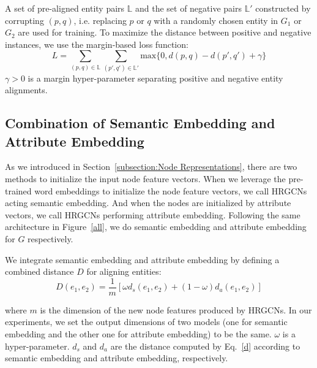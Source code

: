 	A set of pre-aligned entity pairs $\mathbb{L}$ and the set of negative pairs $\mathbb{L'}$  constructed by corrupting $(p, q)$, i.e. replacing $p$ or $q$ with a randomly chosen entity in $G_1$ or $G_2$ are used for training. To maximize the distance between positive and negative instances, we use the margin-based loss function:
	\begin{equation}
	L=\sum\limits_{(p,q)\in \mathbb{L}}\sum\limits_{(p',q')\in \mathbb{L'}}\mathrm{max}\{0,d(p,q)-d(p',q')+\gamma\}
	\end{equation}
	$\gamma > 0$ is a margin hyper-parameter separating positive and negative entity alignments.
	
	\subsection{Combination of Semantic Embedding and Attribute Embedding}
	As we introduced in Section~\ref{subsection:Node Representations}, there are two methods to initialize the input node feature vectors.
	When we leverage the pre-trained word embeddings to initialize the node feature vectors, we call HRGCNs acting semantic embedding.
	And when the nodes are initialized by attribute vectors, we call HRGCNs performing attribute embedding.
	Following the same architecture in Figure~\ref{all}, we do semantic embedding and attribute embedding for $G$ respectively.
	
	We integrate semantic embedding and attribute embedding by defining a combined distance $D$ for aligning entities:
	\begin{equation}
		D(e_1,e_2)=\frac{1}{m}[\omega d_s(e_1,e_2)+(1-\omega)d_a(e_1,e_2)]
	\end{equation}

	where $m$ is the dimension of the new node features produced by HRGCNs.
	In our experiments, we set the output dimensions of two models (one for semantic embedding and the other one for attribute embedding) to be the same.
	$\omega$ is a hyper-parameter. $d_s$ and $d_a$ are the distance computed by Eq.~\ref{d} according to semantic embedding and attribute embedding, respectively.
	
